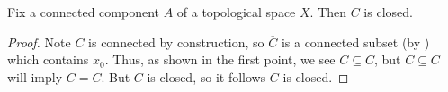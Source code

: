 \documentclass[../notes.tex]{subfiles}
\begin{document}
\begin{lemma}
	Fix a connected component $A$ of a topological space $X$. Then $C$ is closed.
\end{lemma}
\begin{proof}
	Note $C$ is connected by construction, so {$\overline C$ is a connected subset (by ) which contains $x_0$}. Thus, as shown in the first point, we see $\overline C\subseteq C$, but $C\subseteq\overline C$ will imply $C=\overline C$. But $\overline C$ is closed, so it follows $C$ is closed.
\end{proof}


\end{document}
